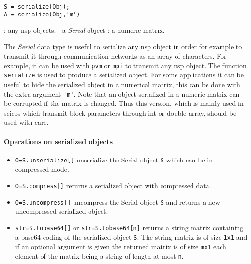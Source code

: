 
\begin{mandesc}
   \\
\end{mandesc}
\begin{calling_sequence}
\begin{verbatim}
S = serialize(Obj);
A = serialize(Obj,'m')
\end{verbatim}
\end{calling_sequence}
\begin{parameters}
  \begin{varlist}
    :  any nsp objects. 
    : a \emph{Serial} object 
    : a numeric matrix.
  \end{varlist}
\end{parameters}

\begin{mandescription}
The \emph{Serial} data type is useful to serialize any nsp object in order 
for example to transmit it through communication networks as an array of 
characters. For example, it can be used with \verb+pvm+ or \verb+mpi+ to transmit any 
nsp object. The function \verb+serialize+ is used to produce a serialized object. 
For some applications it can be useful to hide the serialized object in a 
numerical matrix, this can be done with the extra argument \verb+'m'+. Note 
that an object serialized in a numeric matrix can be corrupted if 
the matrix is changed. Thus this version, which is mainly used in scicos 
which transmit block parameters through int or double array, should 
be used with care. 
\end{mandescription}

\paragraph{Operations on serialized objects}
\begin{itemize}
   \item \verb+O=S.unserialize[]+ unserialize the Serial object \verb+S+ which can be in compressed mode. 
   \item \verb+O=S.compress[]+ returns a serialized object with compressed data. 
   \item \verb+O=S.uncompress[]+ uncompress the Serial object \verb+S+ and returns a new uncompressed serialized object.
   \item \verb+str=S.tobase64[]+ or \verb+str=S.tobase64[n]+ returns a string matrix containing a base64 coding of the 
     serialized object \verb+S+. The string matrix is of size \verb+1x1+ and if an optional argument is given the 
     returned matrix is of size \verb+mx1+ each element of the matrix being a string of length at most \verb+n+.
\end{itemize}

